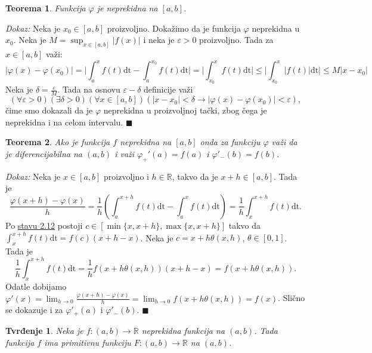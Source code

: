 \documentclass{article}
\newtheorem{teorema}{Teorema}[section]
\newtheorem{tvr}{Tvrđenje}[section]
\begin{document}
\begin{teoremabox}
    \begin{teorema}
        Funkcija $\varphi$ je neprekidna na $[a, b]$.
    \end{teorema}
\end{teoremabox}
\textit{Dokaz:} Neka je $x_0 \in [a ,b]$ proizvoljno.
Dokažimo da je funkcija $\varphi$ neprekidna u $x_0$.
Neka je $M = \displaystyle \sup_{x\in[a,b]} | f(x) |$ i neka je $\varepsilon > 0$
proizvoljno. Tada za $x\in[a,b]$ važi:
\begin{equation*}
    \displaystyle |\varphi(x) - \varphi(x_0)| = \bigg|\int^x_a f(t)\text{dt} - \int^{x_0}_a f(t)\text{dt}\bigg| = \bigg|\int^x_{x_0}f(t)\text{dt}\bigg| \leq \bigg|\int^x_{x_0}|f(t)|\text{dt}\bigg| \leq M|x - x_0|
\end{equation*}
Neka je $\delta=\frac{\varepsilon}{M}$. Tada na osnovu $\varepsilon - \delta$ definicije važi
$$    \displaystyle (\forall \varepsilon > 0)(\exists \delta > 0)(\forall x\in [a, b])(|x-x_0| < \delta \longrightarrow |\varphi(x) - \varphi(x_0)| < \varepsilon),$$
čime smo dokazali da je $\varphi$ neprekidna u proizvoljnoj tački, zbog čega je neprekidna i na celom intervalu.
\null\hfill $\blacksquare$\par
\begin{teoremabox}
    \begin{teorema}
        Ako je funkcija $f$ neprekidna na $[a, b]$ onda za funkciju $\varphi$
        važi da je diferencijabilna na $(a,b)$ i važi $\varphi_+'(a) = f(a)$ i $\varphi'_-(b) = f(b)$.
    \end{teorema}
\end{teoremabox}
\textit{Dokaz:} Neka je $x \in [a, b]$ proizvoljno i $h \in \mathbb{R}$,
takvo da je $x+h\in[a,b]$. Tada je
$$    \frac{\varphi(x+h) - \varphi(x)}{h}  = \frac{1}{h} ( \int^{x+h}_a f(t)\text{dt} - \int^x_a f(t)\text{dt}) = \frac{1}{h} \int^{x+h}_x f(t)\text{dt}.$$
Po \hyperref[Stav_2.12]{stavu 2.12} postoji $c\in[\min\{x, x+h\}, \max\{x, x+h\}]$ takvo da
$\displaystyle\int^{x+h}_x f(t)\text{dt}=f(c)(x+h-x)$.
Neka je $c=x+h\theta(x,h)$, $\theta\in[0,1]$. Tada je
$$ \frac{1}{h} \int^{x+h}_x f(t)\text{dt}=\frac{1}{h} f(x+h\theta(x,h))(x+h-x)=f(x+h\theta(x,h)).$$
Odatle dobijamo $\displaystyle \varphi'(x) =\lim_{h\longrightarrow 0}\frac{\varphi(x+h) - \varphi(x)}{h} = \lim_{h\longrightarrow 0} f(x+h\theta(x, h))= f(x)$.
Slično se dokazuje i za $\varphi'_+(a)$ i $\varphi'_-(b)$.
\null\hfill $\blacksquare$\par
\begin{tvrbox}
    \begin{tvr}
        Neka je $f: (a, b) \longrightarrow \mathbb{R}$ neprekidna funkcija na $(a,b)$. Tada funkcija $f$ ima primitivnu funkciju $F: (a,b)\longrightarrow\mathbb{R}$ na $(a, b)$.
    \end{tvr}
\end{tvrbox}
\end{document}
